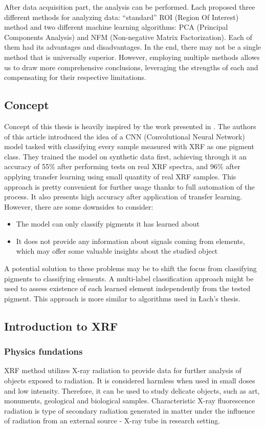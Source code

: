 After data acquisition part, the analysis can be performed. 
Łach proposed three different methods for analyzing data: ``standard'' ROI (Region Of Interest) method and two different machine learning algorithms: PCA (Principal Components Analysis) and NFM (Non-negative Matrix Factorization). 
Each of them had its advantages and disadvantages. 
In the end, there may not be a single method that is universally superior. 
However, employing multiple methods allows us to draw more comprehensive conclusions, leveraging the strengths of each and compensating for their respective limitations.

\subsection{Concept}
Concept of this thesis is heavily inspired by the work presented in \cite{Jones2022}. 
The authors of this article introduced the idea of a CNN (Convolutional Neural Network) model tasked with classifying every sample measured with XRF as one pigment class. 
They trained the model on synthetic data first, achieving through it an accuracy of 55\% after performing tests on real XRF spectra, and 96\% after applying transfer learning using small quantity of real XRF samples.  
This approach is pretty convenient for further usage thanks to full automation of the process. 
It also presents high accuracy after application of transfer learning.
However, there are some downsides to consider:
\begin{itemize}
    \item The model can only classify pigments it has learned about
    \item It does not provide any information about signals coming from elements, which may offer some valuable insights about the studied object
\end{itemize}
A potential solution to these problems may be to shift the focus from classifying pigments to classifying elements. A multi-label classification approach might be used to assess existence of each learned element independently from the tested pigment. This approach is more similar to algorithms used in Łach's thesis.

\subsection{Introduction to XRF}
\subsubsection{Physics fundations}
XRF method utilizes X-ray radiation to provide data for further analysis of objects exposed to radiation. 
It is considered harmless when used in small doses and low intensity.  
Therefore, it can be used to study delicate objects, such as art, monuments, geological and biological samples.
Characteristic X-ray fluorescence radiation is type of secondary radiation generated in matter under the influence of radiation from an external source - X-ray tube in research setting.

